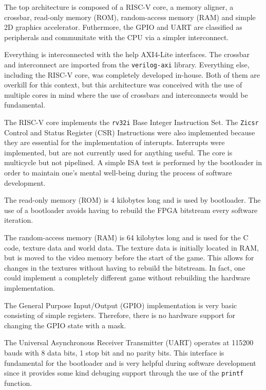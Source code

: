 \documentclass[12pt,a4paper]{article}
\begin{document}
The top architecture is composed of a RISC-V core, a memory aligner, a crossbar,
read-only memory (ROM), random-access memory (RAM) and simple 2D graphics
accelerator. Futhermore, the GPIO and UART are classified as peripherals and
communitate with the CPU via a simpler interconnect.

Everything is interconnected with the help AXI4-Lite interfaces. The crossbar
and interconnect are imported from the \texttt{verilog-axi} library.
Everything else, including the RISC-V core, was completely developed in-house.
Both of them are overkill for this context, but this architecture was conceived
with the use of multiple cores in mind where the use of crossbars and
interconnects would be fundamental.

The RISC-V core implements the \texttt{rv32i} Base Integer Instruction Set. The 
\texttt{Zicsr} Control and Status Register (CSR) Instructions were also
implemented because they are essential for the implementation of interupts. 
Interrupts were implemented, but are not currently used for anything useful.
The core is multicycle but not pipelined. A simple ISA test is performed by the
bootloader in order to maintain one's mental well-being during the process of
software development.

The read-only memory (ROM) is 4 kilobytes long and is used by bootloader. The
use of a bootloader avoids having to rebuild the FPGA bitstream every software
iteration.

The random-access memory (RAM) is 64 kilobytes long and is used for the C code,
texture data and world data. The texture data is initially located in RAM, but
is moved to the video memory before the start of the game. This allows for 
changes in the textures without having to rebuild the bitstream. In fact, one
could implement a completely different game without rebuilding the hardware 
implementation.

The General Purpose Input/Output (GPIO) implementation is very basic consisting
of simple registers. Therefore, there is no hardware support for changing the 
GPIO state with a mask.

The Universal Asynchronous Receiver Transmitter (UART) operates at 115200 bauds
with 8 data bits, 1 stop bit and no parity bits. This interface is fundamental
for the bootloader and is very helpful during software development since it
provides some kind debuging support through the use of the \texttt{printf}
function.
\end{document}
